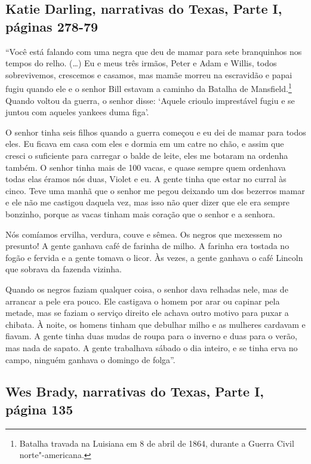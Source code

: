 \subsection{Katie Darling, narrativas do Texas, Parte I, páginas 278-79} \label{ref65}

``Você está falando com uma negra que deu de mamar para sete branquinhos
nos tempos do relho. (\ldots{}) Eu e meus três irmãos, Peter e Adam e
Willis, todos sobrevivemos, crescemos e casamos, mas mamãe morreu na
escravidão e papai fugiu quando ele e o senhor Bill estavam a caminho da
Batalha de Mansfield.\footnote{Batalha travada na Luisiana em 8 de abril de 1864,
durante a Guerra Civil norte"-americana.} Quando voltou da guerra, o senhor disse: `Aquele
crioulo imprestável fugiu e se juntou com aqueles yankees duma figa'.

O senhor tinha seis filhos quando a guerra começou e eu dei de mamar
para todos eles. Eu ficava em casa com eles e dormia em um catre no
chão, e assim que cresci o suficiente para carregar o balde de leite,
eles me botaram na ordenha também. O senhor tinha mais de 100 vacas, e
quase sempre quem ordenhava todas elas éramos nós duas, Violet e eu. A
gente tinha que estar no curral às cinco. Teve uma manhã que o senhor me
pegou deixando um dos bezerros mamar e ele não me castigou daquela vez,
mas isso não quer dizer que ele era sempre bonzinho, porque as vacas
tinham mais coração que o senhor e a senhora.

Nós comíamos ervilha, verdura, couve e sêmea. Os negros que mexessem no
presunto! A gente ganhava café de farinha de milho. A farinha era
tostada no fogão e fervida e a gente tomava o licor. Às vezes, a gente
ganhava o café Lincoln que sobrava da fazenda vizinha.

Quando os negros faziam qualquer coisa, o senhor dava relhadas nele, mas
de arrancar a pele era pouco. Ele castigava o homem por arar ou capinar
pela metade, mas se faziam o serviço direito ele achava outro motivo
para puxar a chibata. À noite, os homens tinham que debulhar milho e as
mulheres cardavam e fiavam. A gente tinha duas mudas de roupa para o
inverno e duas para o verão, mas nada de sapato. A gente trabalhava
sábado o dia inteiro, e se tinha erva no campo, ninguém ganhava o
domingo de folga''.

\subsection{Wes Brady, narrativas do Texas, Parte I, página 135} \label{ref31}

